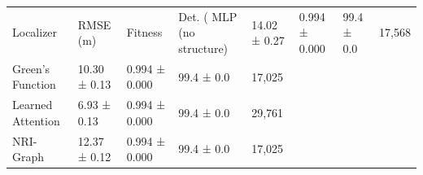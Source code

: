\begin{tabular}{lllll}
\toprule
Localizer & RMSE (m) & Fitness & Det. (%
\midrule
MLP (no structure) & 14.02 ± 0.27 & 0.994 ± 0.000 & 99.4 ± 0.0 & 17,568 \\
Green's Function & 10.30 ± 0.13 & 0.994 ± 0.000 & 99.4 ± 0.0 & 17,025 \\
Learned Attention & 6.93 ± 0.13 & 0.994 ± 0.000 & 99.4 ± 0.0 & 29,761 \\
NRI-Graph & 12.37 ± 0.12 & 0.994 ± 0.000 & 99.4 ± 0.0 & 17,025 \\
\bottomrule
\end{tabular}
